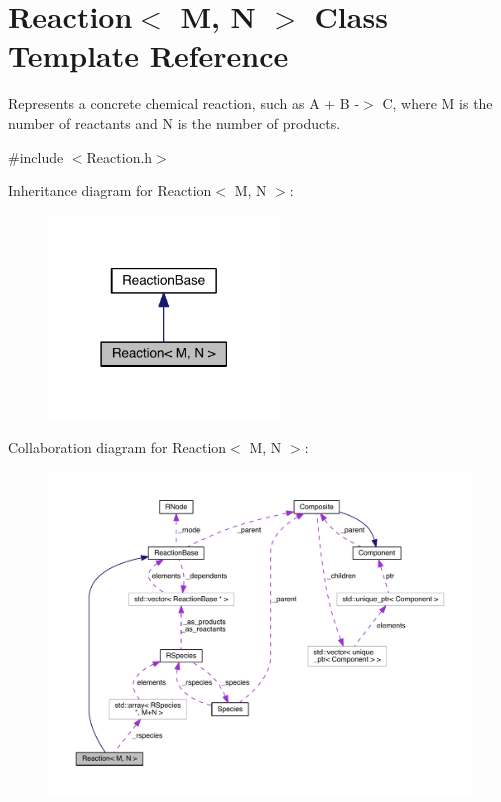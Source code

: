 \hypertarget{classReaction}{\section{Reaction$<$ M, N $>$ Class Template Reference}
\label{classReaction}
}


Represents a concrete chemical reaction, such as A + B -\/$>$ C, where M is the number of reactants and N is the number of products.  




{\ttfamily \#include $<$Reaction.\+h$>$}



Inheritance diagram for Reaction$<$ M, N $>$\+:\nopagebreak
\begin{figure}[H]
\begin{center}
\leavevmode
\includegraphics[width=174pt]{classReaction__inherit__graph}
\end{center}
\end{figure}


Collaboration diagram for Reaction$<$ M, N $>$\+:\nopagebreak
\begin{figure}[H]
\begin{center}
\leavevmode
\includegraphics[width=350pt]{classReaction__coll__graph}
\end{center}
\end{figure}
